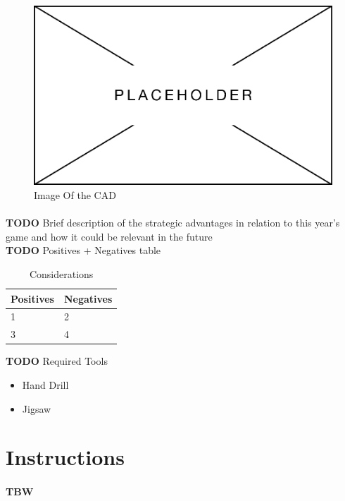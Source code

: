 \documentclass[12pt, a4paper]{article}
\newcommand{\TODO}[1]{{\color{red}\textbf{TODO} #1}}
\begin{document}
\begin{figure}[h]
  \includegraphics{Images/placeholder.png}
  \centering
  \caption{Image Of the CAD}
  \label{fig:intro:gearbox}
\end{figure}

\paragraph{}
\TODO {Brief description of the strategic advantages in relation to this year's game and how it could be relevant in the future} 
\vspace {1em} \\
\TODO {Positives + Negatives table}

\begin{table}[h]
  \centering
  \begin{tabular}{l|l}
    Positives & Negatives \\ \hline \hline
    1 & 2 \\ \hline
    3 & 4 \\ \hline                          
  \end{tabular}
  \caption{Considerations}
\end{table}

\TODO {Required Tools}
\begin{itemize}
  \item Hand Drill
  \item Jigsaw
\end{itemize}

\newpage

\section{Instructions} \label{sec:Instructions}
\paragraph{ TBW }
\end{document}
